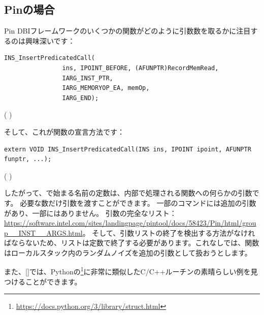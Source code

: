 \subsection{Pinの場合}

Pin \ac{DBI}フレームワークのいくつかの関数がどのように引数数を取るかに注目するのは興味深いです：

\begin{lstlisting}[style=customc]
            INS_InsertPredicatedCall(
                ins, IPOINT_BEFORE, (AFUNPTR)RecordMemRead,
                IARG_INST_PTR,
                IARG_MEMORYOP_EA, memOp,
                IARG_END);
\end{lstlisting}
(  )

そして、これが関数の宣言方法です：

\begin{lstlisting}[style=customc]
extern VOID INS_InsertPredicatedCall(INS ins, IPOINT ipoint, AFUNPTR funptr, ...);
\end{lstlisting}
(  )

したがって、で始まる名前の定数は、内部で処理される関数への何らかの引数です。
必要な数だけ引数を渡すことができます。
一部のコマンドには追加の引数があり、一部にはありません。
引数の完全なリスト：
\url{https://software.intel.com/sites/landingpage/pintool/docs/58423/Pin/html/group__INST__ARGS.html}。
そして、引数リストの終了を検出する方法がなければならないため、リストは定数で終了する必要があります。これなしでは、関数はローカルスタック内のランダムノイズを追加の引数として扱おうとします。

また、[\RobPikePractice]では、Pythonの\footnote{\url{https://docs.python.org/3/library/struct.html}}に非常に類似したC/C++ルーチンの素晴らしい例を見つけることができます。